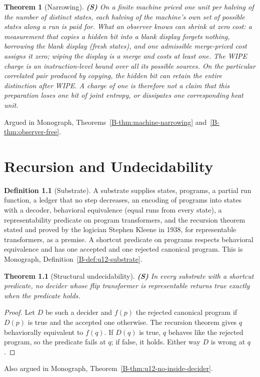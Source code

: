 \documentclass[11pt, a4paper]{report}
\theoremstyle{definition}
\newtheorem{definition}{Definition}[chapter]
\theoremstyle{plain}
\newtheorem{theorem}{Theorem}[chapter]
\begin{document}
\begin{theorem}[Narrowing] \textbf{(S)}
On a finite machine priced one unit per halving of the number of distinct states, each halving of the machine's own set of possible states along a run is paid for. What an observer knows can shrink at zero cost: a measurement that copies a hidden bit into a blank display forgets nothing, borrowing the blank display (fresh states), and one admissible merge-priced cost assigns it zero; wiping the display is a merge and costs at least one.
The WIPE charge is an instruction-level bound over all its possible sources.
On the particular correlated pair produced by copying, the hidden bit can
retain the entire distinction after WIPE. A charge of one is therefore not
a claim that this preparation loses one bit of joint entropy, or dissipates
one corresponding heat unit.
\end{theorem}
\noindent Argued in Monograph, Theorems~\ref{B-thm:machine-narrowing} and~\ref{B-thm:observer-free}.

\chapter{Recursion and Undecidability}\label{ch:undecidability}

\begin{definition}[Substrate]
A substrate supplies states, programs, a partial run function, a ledger that no step decreases, an encoding of programs into states with a decoder, behavioral equivalence (equal runs from every state), a representability predicate on program transformers, and the recursion theorem stated and proved by the logician Stephen Kleene in 1938, for representable transformers, as a premise. A shortcut predicate on programs respects behavioral equivalence and has one accepted and one rejected canonical program. This is Monograph, Definition~\ref{B-def:u12-substrate}.
\end{definition}

\begin{theorem}[Structural undecidability] \textbf{(S)}
In every substrate with a shortcut predicate, no decider whose flip transformer is representable returns true exactly when the predicate holds.
\end{theorem}

\begin{proof}
Let $D$ be such a decider and $f(p)$ the rejected canonical program if $D(p)$ is true and the accepted one otherwise. The recursion theorem gives $q$ behaviorally equivalent to $f(q)$. If $D(q)$ is true, $q$ behaves like the rejected program, so the predicate fails at $q$; if false, it holds. Either way $D$ is wrong at $q$.
\end{proof}
\noindent Also argued in Monograph, Theorem~\ref{B-thm:u12-no-inside-decider}.
\end{document}
